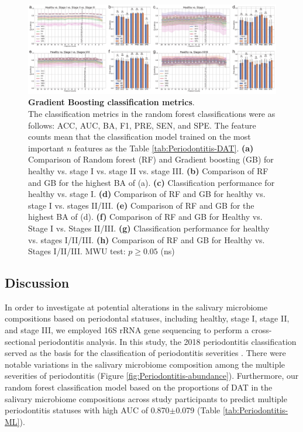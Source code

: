 \documentclass[11pt, a4paper, onecolumn, oneside]{report}
\begin{document}
            \begin{figure}[p]
                \centering
                \includegraphics[width=\linewidth]{Figures/Periodontitis/Figure_R09.pdf}
                \caption[Gradient Boosting classification metrics]{\textbf{Gradient Boosting classification metrics}. \\
                    The classification metrics in the random forest classifications were as follows: ACC, AUC, BA, F1, PRE, SEN, and SPE. The feature counts mean that the classification model trained on the most important $n$ features as the Table \ref{tab:Periodontitis-DAT}. \textbf{(a)} Comparison of Random forest (RF) and Gradient boosting (GB) for healthy vs. stage I vs. stage II vs. stage III. \textbf{(b)} Comparison of RF and GB for the highest BA of (a). \textbf{(c)} Classification performance for healthy vs. stage I. \textbf{(d)} Comparison of RF and GB for healthy vs. stage I vs. stages II/III. \textbf{(e)} Comparison of RF and GB for the highest BA of (d). \textbf{(f)} Comparison of RF and GB for Healthy vs. Stage I vs. Stages II/III. \textbf{(g)} Classification performance for healthy vs. stages I/II/III. \textbf{(h)} Comparison of RF and GB for Healthy vs. Stages I/II/III. MWU test: $p \ge 0.05$ (ns)}
                \label{fig:Periodontitis-GB}
            \end{figure}
            \clearpage
        \newpage

        \subsection{Discussion}
            In order to investigate at potential alterations in the salivary microbiome compositions based on periodontal statuses, including healthy, stage I, stage II, and stage III, we employed 16S rRNA gene sequencing to perform a cross-sectional periodontitis analysis. In this study, the 2018 periodontitis classification served as the basis for the classification of periodontitis severities \cite{Periodontitis-4}. There were notable variations in the salivary microbiome composition among the multiple severities of periodontitis (Figure \ref{fig:Periodontitis-abundance}). Furthermore, our random forest classification model based on the proportions of DAT in the salivary microbiome compositions across study participants to predict multiple periodontitis statuses with high AUC of 0.870$\pm$0.079 (Table \ref{tab:Periodontitis-ML}).
\end{document}

